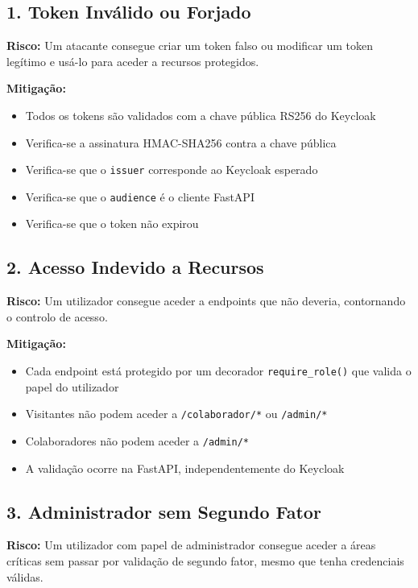 \subsection{1. Token Inválido ou Forjado}

\textbf{Risco:} Um atacante consegue criar um token falso ou modificar um token legítimo e usá-lo para aceder a recursos protegidos.

\textbf{Mitigação:}
\begin{itemize}
  \item Todos os tokens são validados com a chave pública RS256 do Keycloak
  \item Verifica-se a assinatura HMAC-SHA256 contra a chave pública
  \item Verifica-se que o \texttt{issuer} corresponde ao Keycloak esperado
  \item Verifica-se que o \texttt{audience} é o cliente FastAPI
  \item Verifica-se que o token não expirou
\end{itemize}

\subsection{2. Acesso Indevido a Recursos}

\textbf{Risco:} Um utilizador consegue aceder a endpoints que não deveria, contornando o controlo de acesso.

\textbf{Mitigação:}
\begin{itemize}
  \item Cada endpoint está protegido por um decorador \texttt{require\_role()} que valida o papel do utilizador
  \item Visitantes não podem aceder a \texttt{/colaborador/*} ou \texttt{/admin/*}
  \item Colaboradores não podem aceder a \texttt{/admin/*}
  \item A validação ocorre na FastAPI, independentemente do Keycloak
\end{itemize}

\subsection{3. Administrador sem Segundo Fator}

\textbf{Risco:} Um utilizador com papel de administrador consegue aceder a áreas críticas sem passar por validação de segundo fator, mesmo que tenha credenciais válidas.

